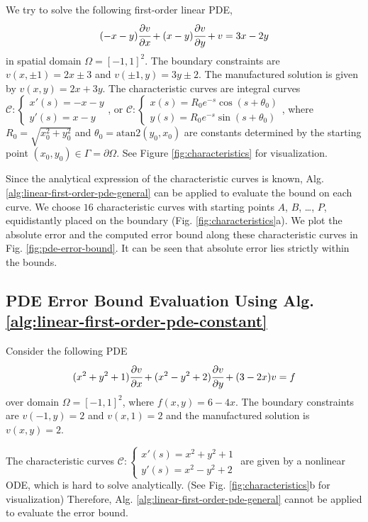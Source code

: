     We try to solve the following first-order linear PDE,
    {
        \begin{equation} \label{eq:attractor}
            (-x -y) \cfrac{\partial v}{\partial x} + (x - y) \cfrac{\partial v}{\partial y} + v = 3x - 2 y
        \end{equation}
    }
    in spatial domain $\Omega=[-1, 1]^2$. 
    The boundary constraints are $v(x, \pm1) =2x\pm 3$ and $v(\pm 1, y) = 3y \pm 2$. 
    The manufactured solution is given by $v(x, y) = 2x + 3y$.
    The characteristic curves are integral curves {$\mathcal{C}: \begin{cases*} x'(s) = -x - y \\[-0.25em] y'(s) = x - y \end{cases*}$}, or {$\mathcal{C}:\begin{cases*} x(s) = R_0 e^{-s} \cos (s+\theta_0)\\[-0.25em] y(s) = R_0 e^{-s} \sin(s + \theta_0) \end{cases*}$}, where $R_0 = \sqrt{x_0^2+y_0^2}$ and $\theta_0 = \mathrm{atan2}(y_0, x_0)$ are constants determined by the starting point $(x_0, y_0) \in \Gamma = \partial \Omega$.
    See Figure \ref{fig:characteristics} for visualization.

    Since the analytical expression of the characteristic curves is known, Alg. \ref{alg:linear-first-order-pde-general} can be applied to evaluate the bound on each curve. 
    We choose $16$ characteristic curves with starting points $A$, $B$, \dots, $P$, equidistantly placed on the boundary (Fig. \ref{fig:characteristics}a). 
    We plot the absolute error and the computed error bound along these characteristic curves in Fig. \ref{fig:pde-error-bound}.
    It can be seen that absolute error lies strictly within the bounds.
\subsection{PDE Error Bound Evaluation Using Alg. \ref{alg:linear-first-order-pde-constant}}
    Consider the following PDE 
    {
        \begin{equation}\label{eq:hard-to-solve-characteristics}
            (x^2+y^2+1)\cfrac{\partial v}{\partial x} + (x^2-y^2+2)\cfrac{\partial v}{\partial y} + (3-2x)v = f
        \end{equation}
    }
    over domain $\Omega = [-1, 1]^2$, where $f(x, y) = 6-4x$.
    The boundary constraints are $v(-1, y) = 2$ and $v(x, 1) = 2$ and the manufactured solution is $v(x, y) = 2$.
    
    The characteristic curves {$\mathcal{C}: \begin{cases*} x'(s) = x^2+y^2+1 \\[-0.25em] y'(s) = x^2 - y^2 + 2 \end{cases*}$} are given by a nonlinear ODE, which is hard to solve analytically. 
    (See Fig. \ref{fig:characteristics}b for visualization)
    Therefore, Alg. \ref{alg:linear-first-order-pde-general} cannot be applied to evaluate the error bound. 

